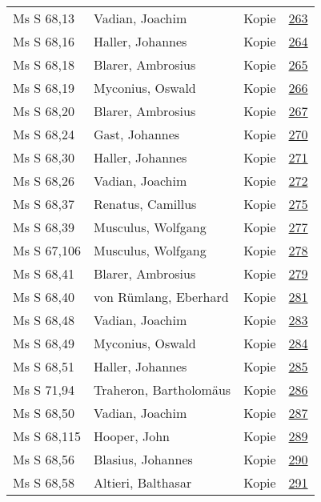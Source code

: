\documentclass[10pt,a4paper,landscape]{report}
\begin{document}
\begin{longtable}{p{16cm}p{4cm}lr}
Ms S 68,13	&	Vadian, Joachim	&	Kopie	&	\href{http://130.60.24.72/assignment/263}{263}\\
Ms S 68,16	&	Haller, Johannes	&	Kopie	&	\href{http://130.60.24.72/assignment/264}{264}\\
Ms S 68,18	&	Blarer, Ambrosius	&	Kopie	&	\href{http://130.60.24.72/assignment/265}{265}\\
Ms S 68,19	&	Myconius, Oswald	&	Kopie	&	\href{http://130.60.24.72/assignment/266}{266}\\
Ms S 68,20	&	Blarer, Ambrosius	&	Kopie	&	\href{http://130.60.24.72/assignment/267}{267}\\
Ms S 68,24	&	Gast, Johannes	&	Kopie	&	\href{http://130.60.24.72/assignment/270}{270}\\
Ms S 68,30	&	Haller, Johannes	&	Kopie	&	\href{http://130.60.24.72/assignment/271}{271}\\
Ms S 68,26	&	Vadian, Joachim	&	Kopie	&	\href{http://130.60.24.72/assignment/272}{272}\\
Ms S 68,37	&	Renatus, Camillus	&	Kopie	&	\href{http://130.60.24.72/assignment/275}{275}\\
Ms S 68,39	&	Musculus, Wolfgang	&	Kopie	&	\href{http://130.60.24.72/assignment/277}{277}\\
Ms S 67,106	&	Musculus, Wolfgang	&	Kopie	&	\href{http://130.60.24.72/assignment/278}{278}\\
Ms S 68,41	&	Blarer, Ambrosius	&	Kopie	&	\href{http://130.60.24.72/assignment/279}{279}\\
Ms S 68,40	&	von Rümlang, Eberhard	&	Kopie	&	\href{http://130.60.24.72/assignment/281}{281}\\
Ms S 68,48	&	Vadian, Joachim	&	Kopie	&	\href{http://130.60.24.72/assignment/283}{283}\\
Ms S 68,49	&	Myconius, Oswald	&	Kopie	&	\href{http://130.60.24.72/assignment/284}{284}\\
Ms S 68,51	&	Haller, Johannes	&	Kopie	&	\href{http://130.60.24.72/assignment/285}{285}\\
Ms S 71,94	&	Traheron, Bartholomäus	&	Kopie	&	\href{http://130.60.24.72/assignment/286}{286}\\
Ms S 68,50	&	Vadian, Joachim	&	Kopie	&	\href{http://130.60.24.72/assignment/287}{287}\\
Ms S 68,115	&	Hooper, John	&	Kopie	&	\href{http://130.60.24.72/assignment/289}{289}\\
Ms S 68,56	&	Blasius, Johannes	&	Kopie	&	\href{http://130.60.24.72/assignment/290}{290}\\
Ms S 68,58	&	Altieri, Balthasar	&	Kopie	&	\href{http://130.60.24.72/assignment/291}{291}\\

\end{longtable}
\end{document}
